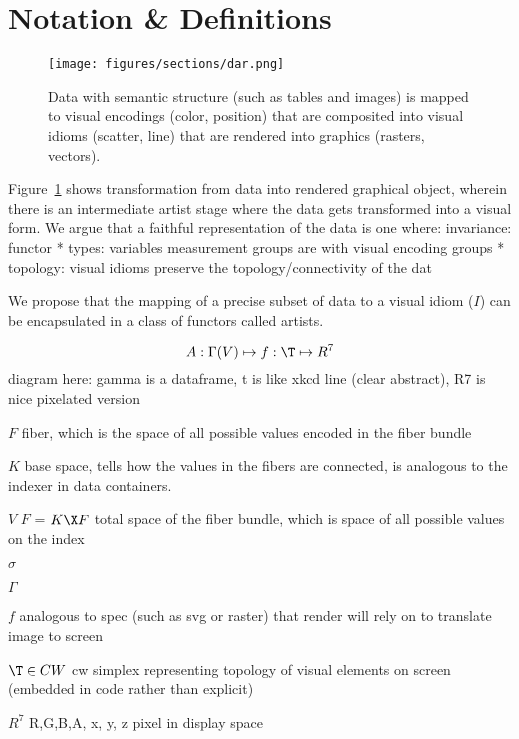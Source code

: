 \documentclass[../intro.tex]{subfiles}
\begin{document}
\section{Notation \& Definitions}
\begin{figure}
    \texttt{[image: figures/sections/dar.png]}
    \caption{Data with semantic structure (such as tables and images) is mapped to visual encodings (color, position) that are composited into visual idioms (scatter, line) that are rendered into graphics (rasters, vectors).}
    \label{fig:artists}
\end{figure}
Figure~\ref{fig:artists} shows transformation from data into rendered graphical object, wherein there is an intermediate artist stage where the data gets transformed into a visual form. We argue that a faithful representation of the data is one where:
invariance:
functor
* types: variables measurement groups are  with visual encoding groups
* topology: visual idioms preserve the topology/connectivity of the dat


We propose that the mapping of a precise subset of data to a visual idiom ($I$) can be encapsulated in a class of functors called artists.

\begin{equation}
    A: \Gamma(V) \mapsto f:\T \mapsto R^{7}
\end{equation}
diagram here: gamma is a dataframe, t is like xkcd line (clear abstract), R7 is nice pixelated version 
\begin{definition}
    \item[$F$] fiber, which is the space of all possible values encoded in the fiber bundle
    \item[$K$] base space, tells how the values in the fibers are connected, is analogous to the indexer in data containers.
    \item[$V$] $F$ = $K \X F$ total space of the fiber bundle, which is space of all possible values on the index 
    \item[$\sigma$]
    \item[$\Gamma$]
    \item[$f$] analogous to spec (such as svg or raster) that render will rely on to translate image to screen
    \item[$\T \in CW$] cw simplex representing topology of visual elements on screen (embedded in code rather than explicit) 
    \item[$R^{7}$]  {R,G,B,A, x, y, z} pixel in display space
\end{definition}
\end{document}
